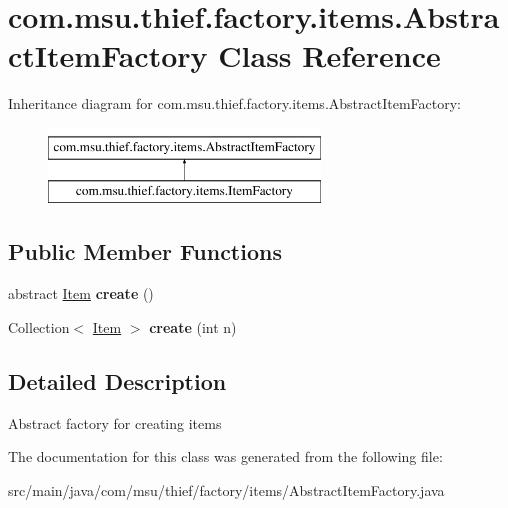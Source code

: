 \hypertarget{classcom_1_1msu_1_1thief_1_1factory_1_1items_1_1AbstractItemFactory}{\section{com.\-msu.\-thief.\-factory.\-items.\-Abstract\-Item\-Factory Class Reference}
\label{classcom_1_1msu_1_1thief_1_1factory_1_1items_1_1AbstractItemFactory}
}
Inheritance diagram for com.\-msu.\-thief.\-factory.\-items.\-Abstract\-Item\-Factory\-:\begin{figure}[H]
\begin{center}
\leavevmode
\includegraphics[height=2.000000cm]{classcom_1_1msu_1_1thief_1_1factory_1_1items_1_1AbstractItemFactory}
\end{center}
\end{figure}
\subsection*{Public Member Functions}
\begin{DoxyCompactItemize}
\item 
\hypertarget{classcom_1_1msu_1_1thief_1_1factory_1_1items_1_1AbstractItemFactory_a85d7e14b1a7d20560df88e59ef7fb259}{abstract \hyperlink{classcom_1_1msu_1_1thief_1_1model_1_1Item}{Item} {\bfseries create} ()}\label{classcom_1_1msu_1_1thief_1_1factory_1_1items_1_1AbstractItemFactory_a85d7e14b1a7d20560df88e59ef7fb259}

\item 
\hypertarget{classcom_1_1msu_1_1thief_1_1factory_1_1items_1_1AbstractItemFactory_ae831f959808ee2603e74baf311b7d4fa}{Collection$<$ \hyperlink{classcom_1_1msu_1_1thief_1_1model_1_1Item}{Item} $>$ {\bfseries create} (int n)}\label{classcom_1_1msu_1_1thief_1_1factory_1_1items_1_1AbstractItemFactory_ae831f959808ee2603e74baf311b7d4fa}

\end{DoxyCompactItemize}


\subsection{Detailed Description}
Abstract factory for creating items 

The documentation for this class was generated from the following file\-:\begin{DoxyCompactItemize}
\item 
src/main/java/com/msu/thief/factory/items/Abstract\-Item\-Factory.\-java\end{DoxyCompactItemize}
